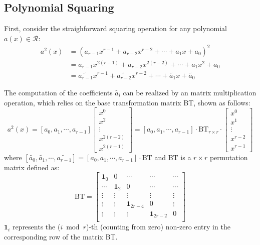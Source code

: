 \documentclass[runningheads]{llncs}
\begin{document}
\subsection{Polynomial Squaring}
\label{sub::square}
First, consider the straighforward squaring operation for any polynomial $a(x)\in \mathcal{R}$:
\begin{align}
    a^2(x) &= (a_{r-1}x^{r-1}+a_{r-2}x^{r-2}+\cdots + a_{1}x + a_0)^2\\
    &= a_{r-1}x^{2(r-1)}+a_{r-2}x^{2(r-2)}+\cdots + a_1x^2 + a_0\\
    &= \widetilde{a_{r-1}}x^{r-1}+\widetilde{a_{r-2}}x^{r-2}+\cdots + \widetilde{a_{1}}x +\widetilde{a_0}
\end{align}

The computation of the coefficients $\widetilde{a_{i}}$ can
be realized by an matrix multiplication operation, 
which relies on the base transformation matrix BT, shown as follows:
\[
a^2(x)= [{a_{0}},{a_{1}},\cdots,{a_{r-1}}]\left[ \begin{array}{c}
x^{0} \\
x^{2} \\
\vdots\\
x^{2(r-2)}\\
x^{2(r-1)}
\end{array}
\right ]
=
[{a_0},{a_1},\cdots,{a_{r-1}}]
\cdot \text{BT}_{r\times r} \cdot
\left[ \begin{array}{c}
x^{0} \\
x^{1} \\
\vdots\\
x^{r-2}\\
x^{r-1}
\end{array}
\right ]
\]
where $[\widetilde{a_{0}},\widetilde{a_{1}},\cdots,\widetilde{a_{r-1}}]=[{a_{0}},{a_{1}},\cdots,{a_{r-1}}]
\cdot \text{BT}$ and BT is a $r\times r$ permutation matrix defined as:
\[
\text{BT} =
\left[ \begin{array}{ccccc}
\mathbf{1}_{0}&0&\cdots&\cdots&\cdots  \\
\cdots&\mathbf{1}_{2}&0 &\cdots&\cdots \\
\vdots&\vdots&\vdots&\vdots&\vdots\\
\vdots&\vdots&\mathbf{1}_{2r-4}&0&\vdots\\
\vdots&\vdots&\vdots&\mathbf{1}_{2r-2}&0\\
\end{array}
\right ]
\]
$\mathbf{1}_{i}$ represents the ($i\bmod r$)-th (counting from zero) non-zero entry in the corresponding row of the matrix BT.
\end{document}
